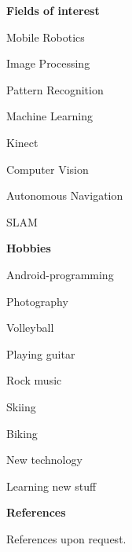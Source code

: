 \documentclass[a4paper,12pt,final]{memoir}
\newcommand{\Sep}{\vspace{1.5em}}
\newcommand{\SmallSep}{\vspace{0.5em}}
\newcommand{\CVSection}[1]
	{\Large\textbf{#1}\par
	\SmallSep\normalsize\normalfont}
\newcommand{\CVItem}[1]
	{\textbf{\color{MidnightBlue} #1}}
\begin{document}
\CVItem{Fields of interest}
\begin{compactitem}[\color{MidnightBlue}$\circ$]
	\item Mobile Robotics
	\item Image Processing 
	\item Pattern Recognition
	\item Machine Learning
	\item Kinect 
	\item Computer Vision 
	\item Autonomous Navigation
	\item SLAM
\end{compactitem}
\Sep 

\framebreak
\clearpage
\framebreak
\framebreak

\CVSection{Hobbies}
\begin{compactitem}[\color{MidnightBlue}$\circ$]
	\item Android-programming
	\item Photography
	\item Volleyball
	\item Playing guitar 
	\item Rock music
	\item Skiing
	\item Biking
	\item New technology
	\item Learning new stuff
\end{compactitem}
\Sep
\CVSection{References}
References upon request.

\clearpage
\framebreak

\end{document}
